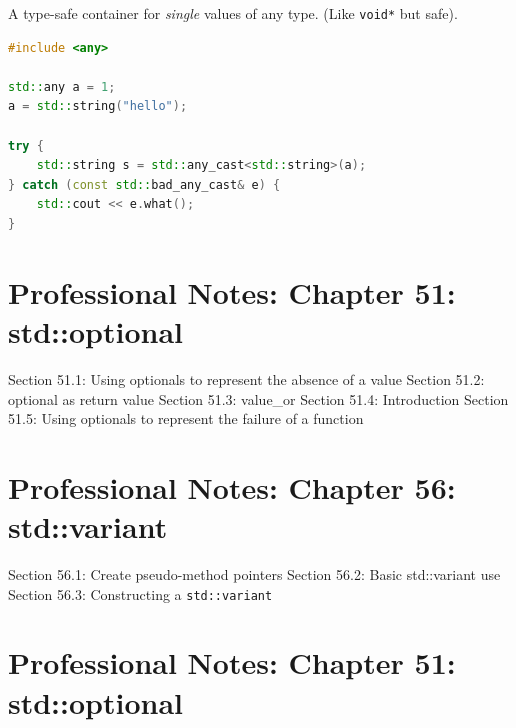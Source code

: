 A type-safe container for \emph{single} values of any type. (Like
\passthrough{\lstinline!void*!} but safe).

\begin{lstlisting}[language={C++}]
#include <any>

std::any a = 1;
a = std::string("hello");

try {
    std::string s = std::any_cast<std::string>(a);
} catch (const std::bad_any_cast& e) {
    std::cout << e.what();
}
\end{lstlisting}

\hypertarget{professional-notes-chapter-51-stdoptional}{%
\chapter{Professional Notes: Chapter 51:
std::optional}\label{professional-notes-chapter-51-stdoptional}}

Section 51.1: Using optionals to represent the absence of a value
Section 51.2: optional as return value Section 51.3: value\_or Section
51.4: Introduction Section 51.5: Using optionals to represent the
failure of a function

\hypertarget{professional-notes-chapter-56-stdvariant}{%
\chapter{Professional Notes: Chapter 56:
std::variant}\label{professional-notes-chapter-56-stdvariant}}

Section 56.1: Create pseudo-method pointers Section 56.2: Basic
std::variant use Section 56.3: Constructing a
\passthrough{\lstinline!std::variant!}

\hypertarget{professional-notes-chapter-51-stdoptional-1}{%
\chapter{Professional Notes: Chapter 51:
std::optional}\label{professional-notes-chapter-51-stdoptional-1}}


